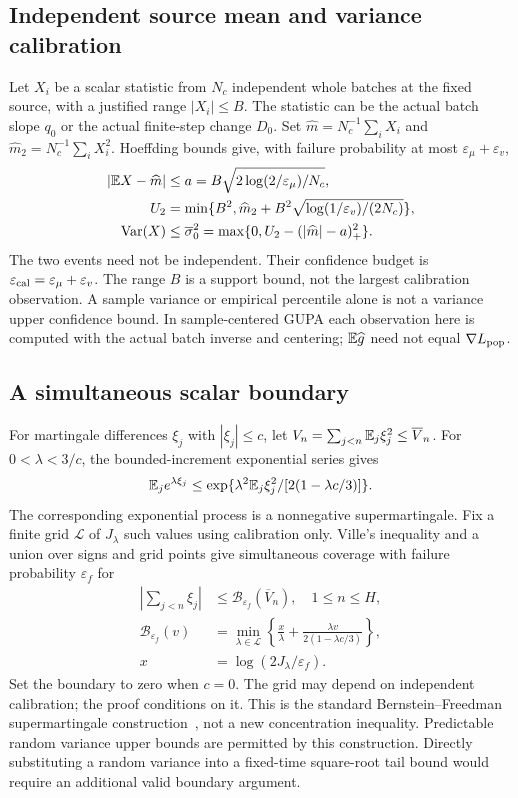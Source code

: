\subsection{Independent source mean and variance calibration}
Let $X_i$ be a scalar statistic from $N_c$ independent whole batches at the fixed source, with a justified range $|X_i|\le B$. The statistic can be the actual batch slope $q_0$ or the actual finite-step change $D_0$. Set $\widehat m=N_c^{-1}\sum_iX_i$ and $\widehat m_2=N_c^{-1}\sum_iX_i^2$. Hoeffding bounds give, with failure probability at most $\varepsilon_\mu+\varepsilon_v$,
\begin{align}
 |\mathbb E X-\widehat m|&\le a=B\sqrt{2\log(2/\varepsilon_\mu)/N_c},\\
 U_2&=\min\{B^2,\widehat m_2+B^2\sqrt{\log(1/\varepsilon_v)/(2N_c)}\},\\
 \operatorname{Var}(X)&\le\overline\sigma_0^2
 =\max\{0,U_2-(|\widehat m|-a)_+^2\}.
 \label{eq:stoch-source-calibration}
\end{align}
The two events need not be independent. Their confidence budget is $\varepsilon_{\rm cal}=\varepsilon_\mu+\varepsilon_v$. The range $B$ is a support bound, not the largest calibration observation. A sample variance or empirical percentile alone is not a variance upper confidence bound. In sample-centered GUPA each observation here is computed with the actual batch inverse and centering; $\mathbb E\widehat g$ need not equal $\nabla L_{\rm pop}$.

\subsection{A simultaneous scalar boundary}
For martingale differences $\xi_j$ with $|\xi_j|\le c$, let $V_n=\sum_{j<n}\mathbb E_j\xi_j^2\le\overline V_n$. For $0<\lambda<3/c$, the bounded-increment exponential series gives
\begin{equation}
 \mathbb E_j e^{\lambda\xi_j}
 \le\exp\{\lambda^2\mathbb E_j\xi_j^2/[2(1-\lambda c/3)]\}.
\end{equation}
The corresponding exponential process is a nonnegative supermartingale. Fix a finite grid $\mathcal L$ of $J_\lambda$ such values using calibration only. Ville's inequality and a union over signs and grid points give simultaneous coverage with failure probability $\varepsilon_f$ for
\begin{align}
 |\sum_{j<n}\xi_j|&\le\mathcal B_{\varepsilon_f}(\overline V_n),\quad 1\le n\le H,\\
 \mathcal B_{\varepsilon_f}(v)&=\min_{\lambda\in\mathcal L}
 \left\{\frac{x}{\lambda}+\frac{\lambda v}{2(1-\lambda c/3)}\right\},\\
 x&=\log(2J_\lambda/\varepsilon_f).
 \label{eq:stoch-lambda-boundary}
\end{align}
Set the boundary to zero when $c=0$. The grid may depend on independent calibration; the proof conditions on it. This is the standard Bernstein--Freedman supermartingale construction~\cite{freedman1975tail,howard2020timeuniform}, not a new concentration inequality. Predictable random variance upper bounds are permitted by this construction. Directly substituting a random variance into a fixed-time square-root tail bound would require an additional valid boundary argument.

